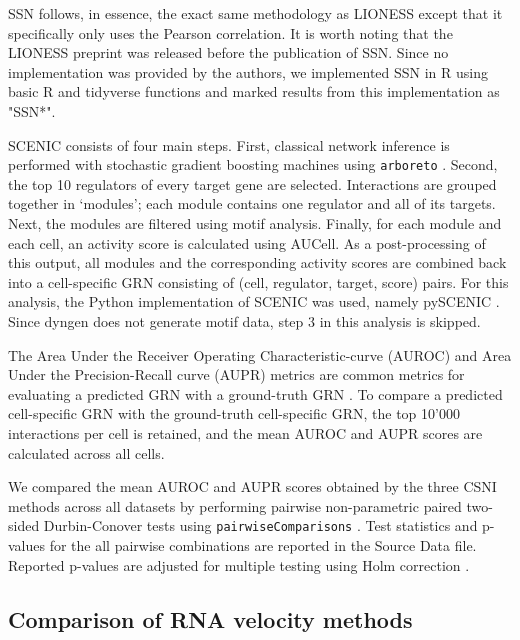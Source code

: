 \documentclass[10pt, a4paper]{article}
\begin{document}
SSN \cite{liu_personalizedcharacterizationdiseases_2016} follows, in
essence, the exact same methodology as LIONESS except that it
specifically only uses the Pearson correlation. It is worth noting that
the LIONESS preprint was released before the publication of SSN. Since
no implementation was provided by the authors, we implemented SSN in R
using basic R and tidyverse functions
\cite{wickham_welcometidyverse_2019} and marked results from this
implementation as "SSN*".

SCENIC \cite{aibar_scenicsinglecellregulatory_2017} consists of four
main steps. First, classical network inference is performed with
stochastic gradient boosting machines using \texttt{arboreto}
\cite{moerman_grnboost2arboretoefficient_2019}. Second, the top 10
regulators of every target gene are selected. Interactions are grouped
together in `modules'; each module contains one regulator and all of its
targets. Next, the modules are filtered using motif analysis. Finally,
for each module and each cell, an activity score is calculated using
AUCell. As a post-processing of this output, all modules and the
corresponding activity scores are combined back into a cell-specific GRN
consisting of (cell, regulator, target, score) pairs. For this analysis,
the Python implementation of SCENIC was used, namely pySCENIC
\cite{vandesande_scalablescenicworkflow_2020}. Since dyngen does not
generate motif data, step 3 in this analysis is skipped.

The Area Under the Receiver Operating Characteristic-curve (AUROC) and
Area Under the Precision-Recall curve (AUPR) metrics are common metrics
for evaluating a predicted GRN with a ground-truth GRN
\cite{marbach_generatingrealisticsilico_2009}. To compare a
predicted cell-specific GRN with the ground-truth cell-specific GRN, the
top 10'000 interactions per cell is retained, and the mean AUROC and
AUPR scores are calculated across all cells.

We compared the mean AUROC and AUPR scores obtained by the three CSNI
methods across all datasets by performing pairwise non-parametric paired
two-sided Durbin-Conover tests
\cite{conover_multiplecomparisonsprocedures_1979} using
\texttt{pairwiseComparisons}
\cite{patil_pairwisecomparisonsmultiplepairwise_2019}. Test
statistics and p-values for the all pairwise combinations are reported
in the Source Data file. Reported p-values are adjusted for multiple
testing using Holm correction
\cite{holm_simplesequentiallyrejective_1979}.

\hypertarget{sec:dyngen-velcompare}{%
	\subsection{Comparison of RNA velocity
		methods}\label{sec:dyngen-velcompare}}
\end{document}
